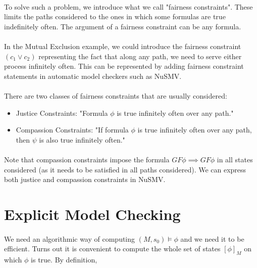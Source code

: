 \documentclass{article}
\theoremstyle{plain}
\theoremstyle{definition}
\begin{document}
\begin{multicols}{2}
\paragraph{} To solve such a problem, we introduce what we call "fairness constraints". These limits the paths considered to the ones in which some formulas are true indefinitely often. The argument of a fairness constraint can be any formula.

\paragraph{} In the Mutual Exclusion example, we could introduce the fairness constraint $(c_1 \lor c_2)$ representing the fact that along any path, we need to serve either process infinitely often. This can be represented by adding fairness constraint statements in automatic model checkers such as NuSMV.

\paragraph{} There are two classes of fairness constraints that are usually considered:

\begin{itemize}
\item Justice Constraints: "Formula $\phi$ is true infinitely often over any path."
\item Compassion Constraints: "If formula $\phi$ is true infinitely often over any path, then $\psi$ is also true infinitely often."
\end{itemize}

\paragraph{} Note that compassion constraints impose the formula $GF\phi \implies GF\phi$ in all states considered (as it needs to be satisfied in all paths considered). We can express both justice and compassion constraints in NuSMV.

\section{Explicit Model Checking}

\paragraph{} We need an algorithmic way of computing $(M, s_0) \models \phi$ and we need it to be efficient. Turns out it is convenient to compute the whole set of states $[\phi]_M$ on which $\phi$ is true. By definition,


\end{multicols}
\end{document}
